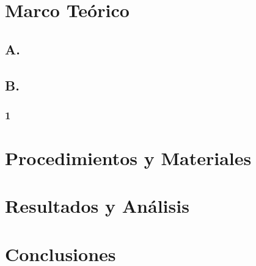 \documentclass[journal]{IEEEtran}
\begin{document}
\section{Marco Teórico}
\subsection*{A.}
{


   
}

\subsection*{B.}
{


}
\subsubsection*{1}
    { 
    
    
    }
   




\section{Procedimientos y Materiales}


\section{Resultados y Análisis}



\section{Conclusiones}







\printbibliography


\end{document}
